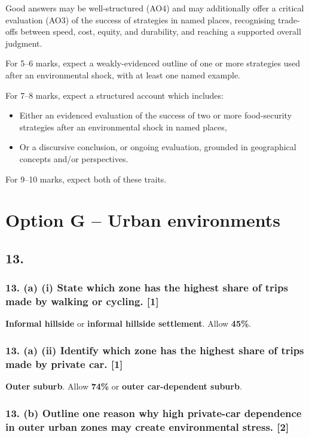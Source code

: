 \documentclass[11pt,a4paper]{article}
\newcommand{\term}[1]{\textbf{#1}}
\begin{document}
Good answers may be well-structured (AO4) and may additionally offer a
critical evaluation (AO3) of the success of strategies in named places,
recognising trade-offs between speed, cost, equity, and durability, and
reaching a supported overall judgment.

For 5--6 marks, expect a weakly-evidenced outline of one or more strategies
used after an environmental shock, with at least one named example.

For 7--8 marks, expect a structured account which includes:
\begin{itemize}
  \item Either an evidenced evaluation of the success of two or more
  food-security strategies after an environmental shock in named places,
  \item Or a discursive conclusion, or ongoing evaluation, grounded in
  geographical concepts and/or perspectives.
\end{itemize}

For 9--10 marks, expect both of these traits.

\newpage

\section*{Option G -- Urban environments}

\subsection*{13.}

\subsubsection*{13. (a) (i) State which zone has the highest share of trips made by walking or cycling. \hfill[1]}

\term{Informal hillside} or \term{informal hillside settlement}. Allow \term{45\%}.

\subsubsection*{13. (a) (ii) Identify which zone has the highest share of trips made by private car. \hfill[1]}

\term{Outer suburb}. Allow \term{74\%} or \term{outer car-dependent suburb}.

\subsubsection*{13. (b) Outline one reason why high private-car dependence in outer urban zones may create environmental stress. \hfill[2]}
\end{document}
